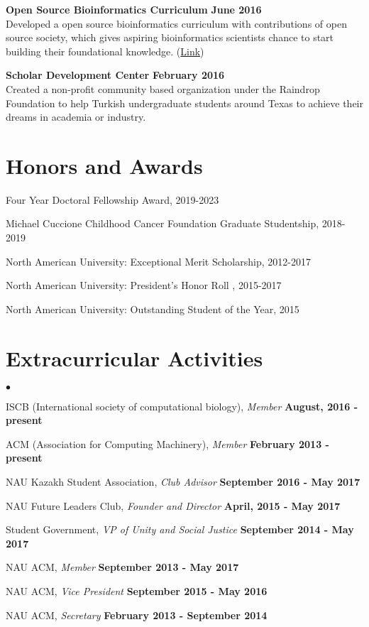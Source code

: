 \documentclass[margin,line]{res}
\newenvironment{list2}{
  \begin{list}{$\bullet$}{%
      \setlength{\itemsep}{0in}
      \setlength{\parsep}{0in} \setlength{\parskip}{0in}
      \setlength{\topsep}{0in} \setlength{\partopsep}{0in}
      \setlength{\leftmargin}{0.2in}}}{\end{list}}
\begin{document}
\begin{resume}

{\bf Open Source Bioinformatics Curriculum} \hfill {\bf June  2016}\\
Developed a open source bioinformatics curriculum with contributions of open source society, which gives aspiring bioinformatics scientists chance to start building their foundational knowledge. (\href{https://github.com/open-source-society/bioinformatics}{Link})

{\bf Scholar Development Center} \hfill {\bf February  2016}\\
Created a non-profit community based organization under the Raindrop Foundation to help Turkish undergraduate students around Texas to achieve their dreams in academia or industry.

\vspace{\baselineskip}

\section{\sc Honors and Awards}

Four Year Doctoral Fellowship Award, 2019-2023

\vspace*{-2.5mm}

Michael Cuccione Childhood Cancer Foundation Graduate Studentship, 2018-2019

\vspace*{-2.5mm}
North American University: Exceptional Merit Scholarship, 2012-2017

\vspace*{-2.5mm}
North American University: President's Honor Roll , 2015-2017

\vspace*{-2.5mm}
North American University: Outstanding Student of the Year, 2015


\section{\sc Extracurricular Activities}
\begin{list2}
\item ISCB (International society of computational biology), {\em Member} \hfill {\bf August, 2016 - present}
\item ACM (Association for Computing Machinery), {\em Member} \hfill  {\bf February 2013 - present}
\item NAU Kazakh Student Association, {\em Club Advisor} \hfill {\bf September 2016 - May 2017}
\item NAU Future Leaders Club, {\em Founder and Director} \hfill {\bf April, 2015 - May 2017}
\item Student Government, {\em VP of Unity and Social Justice} \hfill  {\bf September 2014 - May 2017}
\item NAU ACM, {\em Member} \hfill {\bf September 2013 - May 2017}
\item NAU ACM, {\em Vice President} \hfill  {\bf September 2015 - May 2016}
\item NAU ACM, {\em Secretary} \hfill  {\bf February 2013 - September 2014}
\end{list2}


\end{resume}
\end{document}
